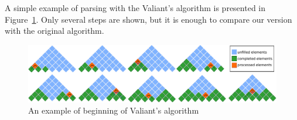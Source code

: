 A simple example of parsing with the Valiant's algorithm is presented in Figure~\ref{fig3}.
Only several steps are shown, but it is enough to compare our version with the original algorithm.

\begin{figure}
\vspace{3mm}
 \begin{center}
 \includegraphics[width=12cm]{pictures/valbeg2.pdf}
    \caption{An example of beginning of Valiant's algorithm}
    \label{fig3}
\end{center}
\vspace{-8mm}
\end{figure}




